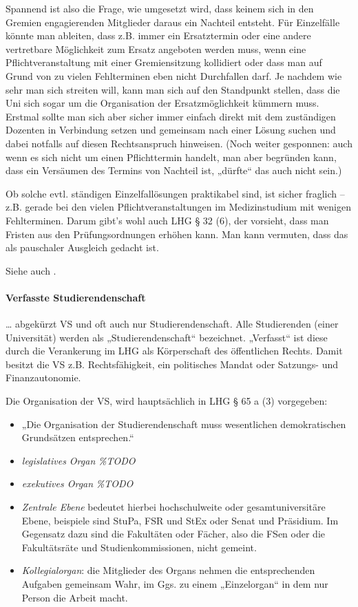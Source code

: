 \documentclass[
10pt,
a4paper,
twoside,								%
titlepage=false,							%
draft=false								%
]{scrartcl}
\begin{document}
Spannend ist also die Frage, wie umgesetzt wird, dass keinem sich in den Gremien engagierenden Mitglieder daraus ein Nachteil entsteht. Für Einzelfälle könnte man ableiten, dass z.B. immer ein Ersatztermin oder eine andere vertretbare Möglichkeit zum Ersatz angeboten werden muss, wenn eine Pflichtveranstaltung mit einer Gremiensitzung kollidiert oder dass man auf Grund von zu vielen Fehlterminen eben nicht Durchfallen darf. Je nachdem wie sehr man sich streiten will, kann man sich auf den Standpunkt stellen, dass die Uni sich sogar um die Organisation der Ersatzmöglichkeit kümmern muss. Erstmal sollte man sich aber sicher immer einfach direkt mit dem zuständigen Dozenten in Verbindung setzen und gemeinsam nach einer Lösung suchen und dabei notfalls auf diesen Rechtsanspruch hinweisen. (Noch weiter gesponnen: auch wenn es sich nicht um einen Pflichttermin handelt, man aber begründen kann, dass ein Versäumen des Termins von Nachteil ist, „dürfte“ das auch nicht sein.)

Ob solche evtl. ständigen Einzelfallösungen praktikabel sind, ist sicher fraglich – z.B. gerade bei den vielen Pflichtveranstaltungen im Medizinstudium mit wenigen Fehlterminen. Darum gibt's wohl auch LHG § 32 (6), der vorsieht, dass man Fristen aus den Prüfungsordnungen erhöhen kann. Man kann vermuten, dass das als pauschaler Ausgleich gedacht ist.

Siehe auch .



\paragraph{Verfasste Studierendenschaft}

… abgekürzt VS und oft auch nur Studierendenschaft. Alle Studierenden (einer Universität) werden als „Studierendenschaft“ bezeichnet. „Verfasst“ ist diese durch die Verankerung im LHG als Körperschaft des öffentlichen Rechts. Damit besitzt die VS z.B. Rechtsfähigkeit, ein politisches Mandat oder Satzungs- und Finanzautonomie.


Die Organisation der VS, wird hauptsächlich in LHG § 65 a (3) vorgegeben:
\begin{itemize}
	\item „Die Organisation der Studierendenschaft muss wesentlichen demokratischen Grundsätzen entsprechen.“
	\item \emph{legislatives Organ} \textit{\%TODO}
	\item \emph{exekutives Organ} \textit{\%TODO}
	\item \emph{Zentrale Ebene} bedeutet hierbei hochschulweite oder gesamtuniversitäre Ebene, beispiele sind StuPa, FSR und StEx oder Senat und Präsidium. Im Gegensatz dazu sind die Fakultäten oder Fächer, also die FSen oder die Fakultätsräte und Studienkommissionen, nicht gemeint.
	\item \emph{Kollegialorgan}: die Mitglieder des Organs nehmen die entsprechenden Aufgaben gemeinsam Wahr, im Ggs. zu einem „Einzelorgan“ in dem nur Person die Arbeit macht.
\end{itemize}
\end{document}
